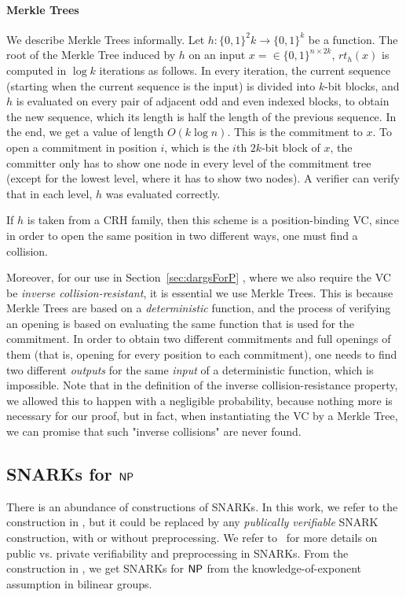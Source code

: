 \paragraph{Merkle Trees} We describe Merkle Trees informally. Let $h:\{0,1\}^2k\to\{0,1\}^k$ be a function. The root of the Merkle Tree induced by $h$ on an input $x = \in\{0,1\}^{n\times 2k}$, $rt_h(x)$ is computed in $\log k$ iterations as follows. In every iteration, the current sequence (starting when the current sequence is the input) is divided into $k$-bit blocks, and $h$ is evaluated on every pair of adjacent odd and even indexed blocks, to obtain the new sequence, which its length is half the length of the previous sequence. In the end, we get a value of length $O(k \log n)$. This is the commitment to $x$. To open a commitment in position $i$, which is the $i$th $2k$-bit block of $x$, the committer only has to show one node in every level of the commitment tree (except for the lowest level, where it has to show two nodes). A verifier can verify that in each level, $h$ was evaluated correctly.

If $h$ is taken from a CRH family, then this scheme is a position-binding VC, since in order to open the same position in two different ways, one must find a collision.

Moreover, for our use in Section~\ref{sec:dargsForP} , where we also require the VC be \emph{inverse collision-resistant}, it is essential we use Merkle Trees. This is because Merkle Trees are based on a \emph{deterministic} function, and the process of verifying an opening is based on evaluating the same function that is used for the commitment. In order to obtain two different commitments and full openings of them (that is, opening for every position to each commitment), one needs to find two different \emph{outputs} for the same \emph{input} of a deterministic function, which is impossible. Note that in the definition of the inverse collision-resistance property, we allowed this to happen with a negligible probability, because nothing more is necessary for our proof, but in fact, when instantiating the VC by a Merkle Tree, we can promise that such "inverse collisions" are never found.

\subsection{SNARKs for ${\mathsf{NP}}$}
There is an abundance of constructions of SNARKs. In this work, we refer to the construction in \cite{bitansky2013SNARKsLIPs}, but it could be replaced by any \emph{publically verifiable} SNARK construction, with or without preprocessing. We refer to~\cite{bitansky2013SNARKsLIPs, bitansky2013recursive} for more details on public vs. private verifiability and preprocessing in SNARKs.
From the construction in \cite{bitansky2013SNARKsLIPs}, we get SNARKs for ${\mathsf{NP}}$ from the knowledge-of-exponent assumption in bilinear groups. 

